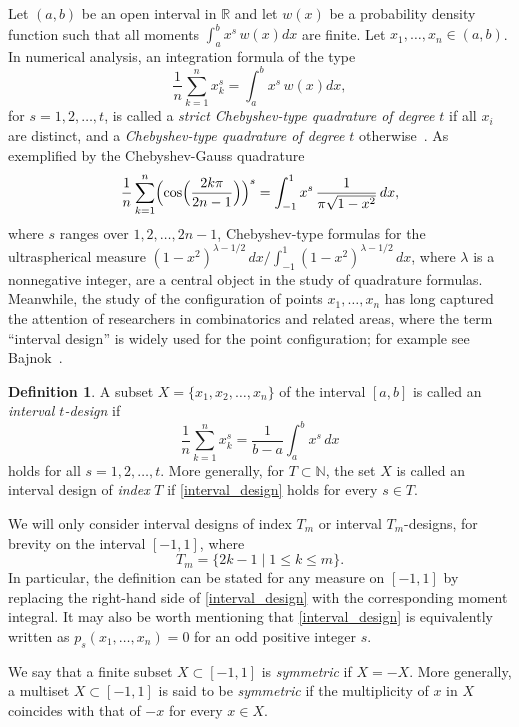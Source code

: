 \documentclass[11pt]{amsart}
\theoremstyle{definition}
\newtheorem{dfn}[thm]{Definition}
\newcommand{\iantipodal}{symmetric}
\begin{document}
Let $(a,b)$ be an open interval in $\mathbb{R}$ and let $w(x)$ be a probability density function such that all moments $\int_a^b x^s \, w(x)dx$ are finite. Let $x_1,\ldots,x_n \in (a,b)$. In numerical analysis, an integration formula of the type
\[
\frac{1}{n}\sum_{k=1}^{n} x_k^s = \int_a^b x^s \, w(x)dx,
\]
for \( s=1,2,\ldots,t \), is called a \emph{strict Chebyshev-type quadrature of degree \( t \)} if all \( x_i \) are distinct, and a \emph{Chebyshev-type quadrature of degree \( t \)} otherwise~\cite{MR1240246}. As exemplified by the Chebyshev-Gauss quadrature
\[
\frac{1}{n}\sum_{k=1}^{n}\Bigl(\cos\Bigl(\frac{2k\pi}{2n-1}\Bigr)\Bigr)^s = \int_{-1}^{1} x^s \, \frac{1}{\pi\sqrt{1-x^2}}\,dx,
\]
where \( s \) ranges over \( 1,2,\dots,2n-1 \), Chebyshev-type formulas for the ultraspherical measure
\(
(1-x^2)^{\lambda-1/2}\,dx/ \int_{-1}^1 (1-x^2)^{\lambda-1/2}\,dx
\), where $\lambda$ is a nonnegative integer, are a central object in the study of quadrature formulas. Meanwhile, the study of the configuration of points \( x_1,\dots,x_n \) has long captured the attention of researchers in combinatorics and related areas, where the term ``interval design'' is widely used for the point configuration; for example see Bajnok~\cite{MR1129808}.

\begin{dfn}
\label{def:intt-design}
A subset \( X = \{x_1, x_2, \dots, x_n\} \) of the interval \([a,b]\) is called an \emph{interval \( t \)-design} if
\begin{equation}\label{interval_design}
\frac{1}{n}\sum_{k=1}^{n} x_k^s = \frac{1}{b-a}\int_a^b x^s\,dx
\end{equation}
holds for all \( s=1,2,\dots,t \). More generally, for \( T\subset\mathbb{N} \), the set \( X \) is called an interval design of \emph{index} \( T \) if \eqref{interval_design} holds for every \( s\in T \).

We will only consider interval designs of index \( T_m \) or interval \( T_m \)-designs, for brevity on the interval \([-1,1]\), where
\begin{equation}\label{Tm}
T_m=\{2k-1\mid 1\le k\le m\}.
\end{equation}
In particular, the definition can be stated for any measure on \([-1,1]\) by replacing the right-hand side of \eqref{interval_design} with the corresponding moment integral. 
It may also be worth mentioning that \eqref{interval_design} is equivalently written as \(p_s(x_1,\dots,x_n)=0\) for an odd positive integer \(s\).

We say that a finite subset \( X\subset[-1,1] \) is \emph{\iantipodal} if \( X = -X \). More generally, a multiset \( X\subset[-1,1] \) is said to be \emph{\iantipodal} if the multiplicity of \( x \) in \( X \) coincides with that of \( -x \) for every \( x\in X \).
\end{dfn}
\end{document}
